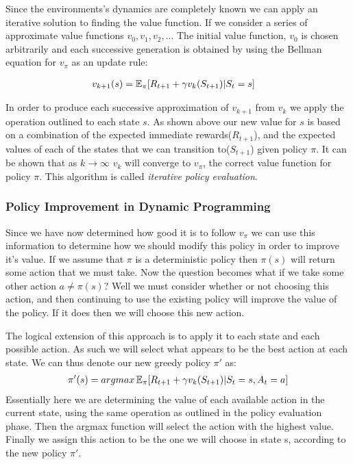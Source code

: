 Since the environments's dynamics are completely known we can apply an iterative solution to finding
the value function.
If we consider a series of approximate value functions $v_0, v_1, v_2,..$.
The initial value function, $v_0$ is chosen arbitrarily and each successive generation is obtained by
using the Bellman equation for $v_\pi$ as an update rule\citep{sutton1998reinforcement}:

\begin{align}
    v_{k+1}(s) &= \operatorname{\mathbb{E}}_{\pi}\lbrack R_{t+1} + \gamma v_k(S_{t+1}) | S_t = s \rbrack
\end{align}

In order to produce each successive approximation of $v_{k+1}$ from $v_k$ we apply the operation outlined to each
state $s$.
As shown above our new value for $s$ is based on a combination of the expected immediate rewards($R_{t+1}$),
and the expected values of each of the states that we can transition to($S_{t+1}$) given policy $\pi$.
It can be shown that as $k\rightarrow\infty$ $v_k$ will converge to $v_\pi$, the correct value function for policy
$\pi$.
This algorithm is called \textit{iterative policy evaluation}\citep{sutton1998reinforcement}.

\subsubsection{Policy Improvement in Dynamic Programming}
Since we have now determined how good it is to follow $v_\pi$ we can use this information to determine how
we should modify this policy in order to improve it's value.
If we assume that $\pi$ is a deterministic policy then $\pi(s)$ will return some action that we must take.
Now the question becomes what if we take some other action $a \neq \pi(s)$?
Well we must consider whether or not choosing this action, and then continuing to use the existing policy will
improve the value of the policy.
If it does then we will choose this new action.

The logical extension of this approach is to apply it to each state and each possible action.
As such we will select what appears to be the best action at each state.
We can thus denote our new greedy policy $\pi'$ as:
\begin{align}
    \pi'(s) = argmax\operatorname{\mathbb{E}}_{\pi}\lbrack R_{t+1} + \gamma v_k(S_{t+1}) | S_t = s, A_t = a\rbrack
\end{align}
Essentially here we are determining the value of each available action in the current state, using the same operation
as outlined in the policy evaluation phase.
Then the argmax function will select the action with the highest value.
Finally we assign this action to be the one we will choose in state s, according to the new policy $\pi'$.

